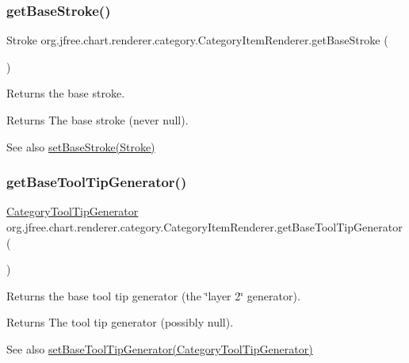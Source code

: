 \subsubsection{\texorpdfstring{get\+Base\+Stroke()}{getBaseStroke()}}
{\footnotesize\ttfamily Stroke org.\+jfree.\+chart.\+renderer.\+category.\+Category\+Item\+Renderer.\+get\+Base\+Stroke (\begin{DoxyParamCaption}{ }\end{DoxyParamCaption})}

Returns the base stroke.

\begin{DoxyReturn}{Returns}
The base stroke (never {\ttfamily null}).
\end{DoxyReturn}
\begin{DoxySeeAlso}{See also}
\mbox{\hyperlink{interfaceorg_1_1jfree_1_1chart_1_1renderer_1_1category_1_1_category_item_renderer_a4257e7b0cbcca4dcb130a2f0e239c0cd}{set\+Base\+Stroke(\+Stroke)}} 
\end{DoxySeeAlso}
\mbox{\label{interfaceorg_1_1jfree_1_1chart_1_1renderer_1_1category_1_1_category_item_renderer_a7645a46ca7fd406133337313e00154aa}} 
\subsubsection{\texorpdfstring{get\+Base\+Tool\+Tip\+Generator()}{getBaseToolTipGenerator()}}
{\footnotesize\ttfamily \mbox{\hyperlink{interfaceorg_1_1jfree_1_1chart_1_1labels_1_1_category_tool_tip_generator}{Category\+Tool\+Tip\+Generator}} org.\+jfree.\+chart.\+renderer.\+category.\+Category\+Item\+Renderer.\+get\+Base\+Tool\+Tip\+Generator (\begin{DoxyParamCaption}{ }\end{DoxyParamCaption})}

Returns the base tool tip generator (the \char`\"{}layer 2\char`\"{} generator).

\begin{DoxyReturn}{Returns}
The tool tip generator (possibly {\ttfamily null}).
\end{DoxyReturn}
\begin{DoxySeeAlso}{See also}
\mbox{\hyperlink{interfaceorg_1_1jfree_1_1chart_1_1renderer_1_1category_1_1_category_item_renderer_a8278a41153ebf3551e122550476ab646}{set\+Base\+Tool\+Tip\+Generator(\+Category\+Tool\+Tip\+Generator)}} 
\end{DoxySeeAlso}


